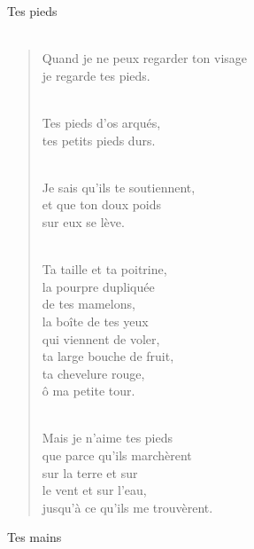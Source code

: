 \documentclass[11pt,a4paper]{book}
\begin{document}
\newpage

{\huge Tes pieds} \\ \\

\begin{verse}
Quand je ne peux regarder ton visage \\
je regarde tes pieds. \\ \

Tes pieds d'os arqués, \\
tes petits pieds durs. \\ \

Je sais qu'ils te soutiennent, \\
et que ton doux poids \\
sur eux se lève. \\ \

Ta taille et ta poitrine, \\
la pourpre dupliquée \\
de tes mamelons, \\
la boîte de tes yeux \\
qui viennent de voler, \\
ta large bouche de fruit, \\
ta chevelure rouge, \\
ô ma petite tour. \\ \

Mais je n'aime tes pieds \\
que parce qu'ils marchèrent \\
sur la terre et sur \\
le vent et sur l'eau, \\
jusqu'à ce qu'ils me trouvèrent.
\end{verse}

\newpage

{\huge Tes mains} \\ \\
\end{document}
